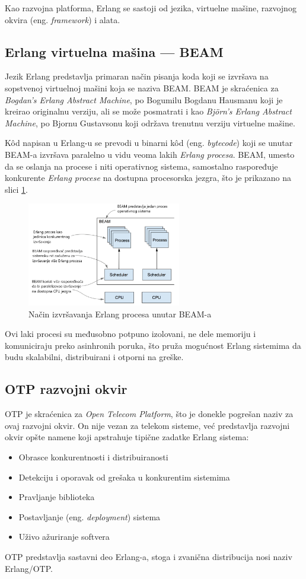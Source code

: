\documentclass[12pt,oneside]{memoir}
\begin{document}
Kao razvojna platforma, Erlang se sastoji od jezika, virtuelne mašine, razvojnog okvira (eng.
\emph{framework}) i alata.
\subsection{Erlang virtuelna mašina --- BEAM}
Jezik Erlang predstavlja primaran način pisanja koda koji se izvršava na sopstvenoj virtuelnoj
mašini koja se naziva BEAM. BEAM je skraćenica za \emph{Bogdan’s Erlang Abstract Machine}, po
Bogumilu Bogdanu Hausmanu koji je kreirao originalnu verziju, ali se može posmatrati i kao
\emph{Björn’s Erlang Abstract Machine}, po Bjornu Gustavsonu koji održava trenutnu verziju 
virtuelne mašine. 

K\^{o}d napisan u Erlang-u se prevodi u binarni k\^{o}d (eng. \emph{bytecode})
koji se unutar BEAM-a izvršava paralelno u vidu veoma lakih \emph{Erlang procesa}. BEAM, umesto 
da se oslanja na procese i niti operativnog sistema, samostalno raspoređuje konkurente
\emph{Erlang procese} na dostupna procesorska jezgra, što je prikazano na slici \ref{fig:beam}.
\begin{figure}[h]
  \centering
  \includegraphics[width=0.6\textwidth]{beam.png}
  \caption{Način izvršavanja Erlang procesa unutar BEAM-a \cite{elixirInAction}}
  \label{fig:beam}
\end{figure}
Ovi laki procesi su međusobno potpuno izolovani, ne dele memoriju i komuniciraju preko
asinhronih poruka, što pruža mogućnost Erlang sistemima da budu skalabilni, distribuirani i 
otporni na greške.  

\subsection{OTP razvojni okvir}
OTP je skraćenica za \emph{Open Telecom Platform}, što je donekle pogrešan naziv za ovaj razvojni
okvir. On nije vezan za telekom sisteme, već predstavlja razvojni okvir opšte namene koji
apstrahuje tipične zadatke Erlang sistema:
\begin{itemize}
  \item Obrasce konkurentnosti i distribuiranosti
  \item Detekciju i oporavak od grešaka u konkurentim sistemima
  \item Pravljanje biblioteka
  \item Postavljanje (eng. \emph{deployment}) sistema
  \item Uživo ažuriranje softvera 
\end{itemize}
OTP predstavlja sastavni deo Erlang-a, stoga i zvanična distribucija nosi naziv Erlang/OTP.
\end{document}
